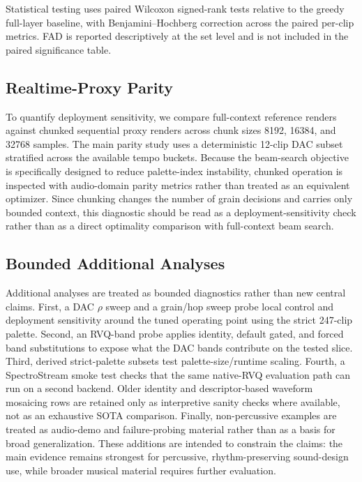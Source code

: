 \documentclass[twoside,a4paper]{article}
\begin{document}
Statistical testing uses paired Wilcoxon signed-rank tests \cite{Wilcoxon:1945:IndividualComparisons} relative to the greedy full-layer baseline, with Benjamini--Hochberg correction \cite{Benjamini:1995:FDR} across the paired per-clip metrics. FAD is reported descriptively at the set level and is not included in the paired significance table.

\subsection{Realtime-Proxy Parity}

To quantify deployment sensitivity, we compare full-context reference renders against chunked sequential proxy renders across chunk sizes 8192, 16384, and 32768 samples. The main parity study uses a deterministic 12-clip DAC subset stratified across the available tempo buckets. Because the beam-search objective is specifically designed to reduce palette-index instability, chunked operation is inspected with audio-domain parity metrics rather than treated as an equivalent optimizer. Since chunking changes the number of grain decisions and carries only bounded context, this diagnostic should be read as a deployment-sensitivity check rather than as a direct optimality comparison with full-context beam search.

\subsection{Bounded Additional Analyses}

Additional analyses are treated as bounded diagnostics rather than new central claims. First, a DAC $\rho$ sweep and a grain/hop sweep probe local control and deployment sensitivity around the tuned operating point using the strict 247-clip palette. Second, an RVQ-band probe applies identity, default gated, and forced band substitutions to expose what the DAC bands contribute on the tested slice. Third, derived strict-palette subsets test palette-size/runtime scaling. Fourth, a SpectroStream smoke test checks that the same native-RVQ evaluation path can run on a second backend. Older identity and descriptor-based waveform mosaicing rows are retained only as interpretive sanity checks where available, not as an exhaustive SOTA comparison. Finally, non-percussive examples are treated as audio-demo and failure-probing material rather than as a basis for broad generalization. These additions are intended to constrain the claims: the main evidence remains strongest for percussive, rhythm-preserving sound-design use, while broader musical material requires further evaluation.
\end{document}
